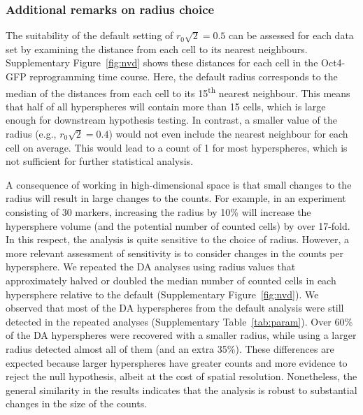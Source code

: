 \documentclass{article}
\begin{document}
\subsubsection{Additional remarks on radius choice}
\label{sec:additionalradius}

The suitability of the default setting of $r_0\sqrt{2}=0.5$ can be assessed for each data set by examining the distance from each cell to its nearest neighbours.
Supplementary Figure~\ref{fig:nvd} shows these distances for each cell in the Oct4-GFP reprogramming time course.
Here, the default radius corresponds to the median of the distances from each cell to its 15\textsuperscript{th} nearest neighbour.
This means that half of all hyperspheres will contain more than 15 cells, which is large enough for downstream hypothesis testing.
In contrast, a smaller value of the radius (e.g., $r_0\sqrt{2}=0.4$) would not even include the nearest neighbour for each cell on average.
This would lead to a count of 1 for most hyperspheres, which is not sufficient for further statistical analysis.


A consequence of working in high-dimensional space is that small changes to the radius will result in large changes to the counts.
For example, in an experiment consisting of 30 markers, increasing the radius by 10\% will increase the hypersphere volume (and the potential number of counted cells) by over 17-fold. 
In this respect, the analysis is quite sensitive to the choice of radius.
However, a more relevant assessment of sensitivity is to consider changes in the counts per hypersphere.
We repeated the DA analyses using radius values that approximately halved or doubled the median number of counted cells in each hypersphere relative to the default (Supplementary Figure~\ref{fig:nvd}).
We observed that most of the DA hyperspheres from the default analysis were still detected in the repeated analyses (Supplementary Table~\ref{tab:param}).
Over 60\% of the DA hyperspheres were recovered with a smaller radius, while using a larger radius detected almost all of them (and an extra 35\%).
These differences are expected because larger hyperspheres have greater counts and more evidence to reject the null hypothesis, albeit at the cost of spatial resolution.
Nonetheless, the general similarity in the results indicates that the analysis is robust to substantial changes in the size of the counts.
\end{document}
